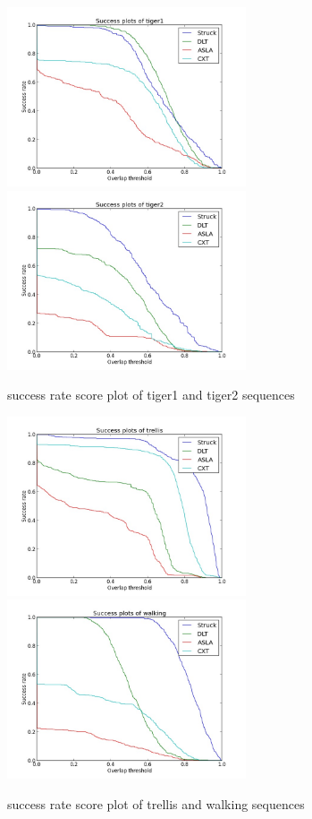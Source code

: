 \documentclass{article}
\begin{document}
\begin{figure}[hbt]
  \includegraphics[width=200pt]{tiger1.jpg}
  \includegraphics[width=200pt]{tiger2.jpg}
  \label{fig:tiger2}
  \caption{success rate score plot of tiger1 and tiger2 sequences}
\end{figure}

\begin{figure}[hbt]
  \includegraphics[width=200pt]{trellis.jpg}
  \includegraphics[width=200pt]{walking.jpg}
  \label{fig:walking}
  \caption{success rate score plot of trellis and walking sequences}
\end{figure}
\end{document}
